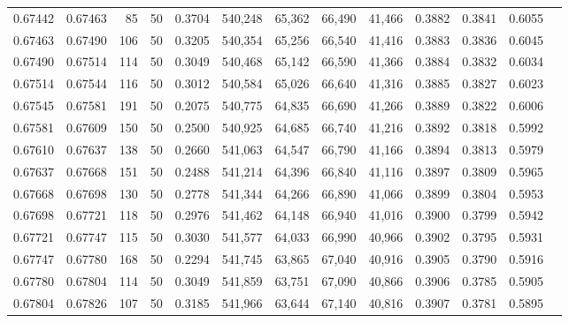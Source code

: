 \begin{tabular}{rrrrrrrrrrrrr}
0.67442 & 0.67463 &    85 &  50 &                                     0.3704 & 540,248 &  65,362 &  66,490 &  41,466 & 0.3882 & 0.3841 & 0.6055 \\
0.67463 & 0.67490 &   106 &  50 &                                     0.3205 & 540,354 &  65,256 &  66,540 &  41,416 & 0.3883 & 0.3836 & 0.6045 \\
0.67490 & 0.67514 &   114 &  50 &                                     0.3049 & 540,468 &  65,142 &  66,590 &  41,366 & 0.3884 & 0.3832 & 0.6034 \\
0.67514 & 0.67544 &   116 &  50 &                                     0.3012 & 540,584 &  65,026 &  66,640 &  41,316 & 0.3885 & 0.3827 & 0.6023 \\
0.67545 & 0.67581 &   191 &  50 &                                     0.2075 & 540,775 &  64,835 &  66,690 &  41,266 & 0.3889 & 0.3822 & 0.6006 \\
0.67581 & 0.67609 &   150 &  50 &                                     0.2500 & 540,925 &  64,685 &  66,740 &  41,216 & 0.3892 & 0.3818 & 0.5992 \\
0.67610 & 0.67637 &   138 &  50 &                                     0.2660 & 541,063 &  64,547 &  66,790 &  41,166 & 0.3894 & 0.3813 & 0.5979 \\
0.67637 & 0.67668 &   151 &  50 &                                     0.2488 & 541,214 &  64,396 &  66,840 &  41,116 & 0.3897 & 0.3809 & 0.5965 \\
0.67668 & 0.67698 &   130 &  50 &                                     0.2778 & 541,344 &  64,266 &  66,890 &  41,066 & 0.3899 & 0.3804 & 0.5953 \\
0.67698 & 0.67721 &   118 &  50 &                                     0.2976 & 541,462 &  64,148 &  66,940 &  41,016 & 0.3900 & 0.3799 & 0.5942 \\
0.67721 & 0.67747 &   115 &  50 &                                     0.3030 & 541,577 &  64,033 &  66,990 &  40,966 & 0.3902 & 0.3795 & 0.5931 \\
0.67747 & 0.67780 &   168 &  50 &                                     0.2294 & 541,745 &  63,865 &  67,040 &  40,916 & 0.3905 & 0.3790 & 0.5916 \\
0.67780 & 0.67804 &   114 &  50 &                                     0.3049 & 541,859 &  63,751 &  67,090 &  40,866 & 0.3906 & 0.3785 & 0.5905 \\
0.67804 & 0.67826 &   107 &  50 &                                     0.3185 & 541,966 &  63,644 &  67,140 &  40,816 & 0.3907 & 0.3781 & 0.5895 \\

\end{tabular}
